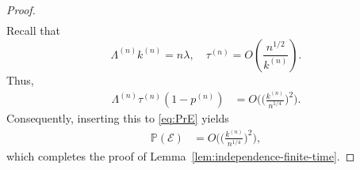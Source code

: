 \documentclass[sigconf]{acmart}
\renewcommand{\Pr}{\mathbb{P}} %
\newcommand{\supn}{^{(n)}}
\begin{document}
\begin{proof}
\begin{align*}
\end{align*}
Recall that
\begin{equation*}
\Lambda\supn k\supn=n\lambda,\quad \tau\supn=O\left(\frac{n^{1/2}}{k\supn}\right).
\end{equation*}
Thus,
\begin{align*}
\Lambda\supn\tau\supn(1-p\supn)%
&=O\Biggl(\biggl(\frac{k\supn}{n^{1/4}}\biggr)^2\Biggr).
\end{align*}
Consequently, inserting this to \eqref{eq:PrE} yields
\begin{align*}
\Pr(\mathcal{E})
&=O\Biggl(\biggl(\frac{k\supn}{n^{1/4}}\biggr)^2\Biggr),
\end{align*}
which completes the proof of Lemma~\ref{lem:independence-finite-time}.
\end{proof}
\end{document}
